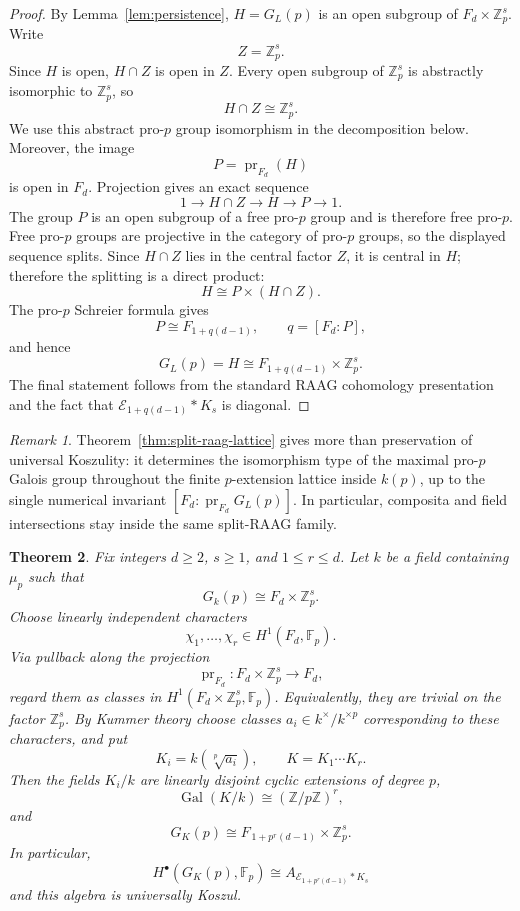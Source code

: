 \documentclass[12pt]{amsart}
\theoremstyle{plain}
\newtheorem{theorem}{Theorem}[section]
\theoremstyle{definition}
\theoremstyle{remark}
\newtheorem{remark}[theorem]{Remark}
\numberwithin{equation}{section}
\newcommand{\Fp}{\mathbb{F}_p}
\begin{document}
\begin{proof}
By Lemma~\ref{lem:persistence}, \(H=G_L(p)\) is an open subgroup of
\(F_d\times\mathbb Z_p^s\). Write
\[
Z=\mathbb Z_p^s.
\]
Since \(H\) is open, \(H\cap Z\) is open in \(Z\). Every open subgroup
of \(\mathbb Z_p^s\) is abstractly isomorphic to \(\mathbb Z_p^s\), so
\[
H\cap Z\cong\mathbb Z_p^s.
\]
We use this abstract pro-\(p\) group isomorphism in the decomposition below.
Moreover, the image
\[
P=\operatorname{pr}_{F_d}(H)
\]
is open in \(F_d\). Projection gives an exact sequence
\[
1\longrightarrow H\cap Z
\longrightarrow H
\longrightarrow P
\longrightarrow1.
\]
The group \(P\) is an open subgroup of a free pro-\(p\) group and is
therefore free pro-\(p\). Free pro-\(p\) groups are projective in the
category of pro-\(p\) groups, so the displayed sequence splits. Since
\(H\cap Z\) lies in the central factor \(Z\), it is central in \(H\);
therefore the splitting is a direct product:
\[
H\cong P\times(H\cap Z).
\]
The pro-\(p\) Schreier formula gives
\[
P\cong F_{1+q(d-1)},
\qquad q=[F_d:P],
\]
and hence
\[
G_L(p)=H\cong F_{1+q(d-1)}\times\mathbb Z_p^s.
\]
The final statement follows from the standard RAAG cohomology
presentation and the fact that
\(\mathcal E_{1+q(d-1)}\ast K_s\) is diagonal.
\end{proof}

\begin{remark}
Theorem~\ref{thm:split-raag-lattice} gives more than preservation of
universal Koszulity: it determines the isomorphism type of the maximal
pro-\(p\) Galois group throughout the finite \(p\)-extension lattice inside \(k(p)\),
up to the single numerical invariant
\([F_d:\operatorname{pr}_{F_d}G_L(p)]\). In particular, composita and
field intersections stay inside the same split-RAAG family.
\end{remark}

\begin{theorem}
\label{thm:split-raag-composita}
Fix integers \(d\ge2\), \(s\ge1\), and \(1\le r\le d\). Let \(k\) be
a field containing \(\mu_p\) such that
\[
G_k(p)\cong F_d\times\mathbb Z_p^s.
\]
Choose linearly independent characters
\[
\chi_1,\dots,\chi_r\in H^1(F_d,\Fp).
\]
Via pullback along the projection
\[
\operatorname{pr}_{F_d}:F_d\times\mathbb Z_p^s\longrightarrow F_d,
\]
regard them as classes in \(H^1(F_d\times\mathbb Z_p^s,\Fp)\).
Equivalently, they are trivial on the factor \(\mathbb Z_p^s\). By
Kummer theory choose classes \(a_i\in k^\times/k^{\times p}\)
corresponding to these characters, and put
\[
K_i=k(\sqrt[p]{a_i}),
\qquad
K=K_1\cdots K_r.
\]
Then the fields \(K_i/k\) are linearly disjoint cyclic extensions of
degree \(p\),
\[
\operatorname{Gal}(K/k)\cong (\mathbb Z/p\mathbb Z)^r,
\]
and
\[
G_K(p)
\cong
F_{\,1+p^r(d-1)}\times\mathbb Z_p^s.
\]
In particular,
\[
H^\bullet(G_K(p),\Fp)
\cong
A_{\mathcal E_{1+p^r(d-1)}\ast K_s}
\]
and this algebra is universally Koszul.
\end{theorem}
\end{document}
